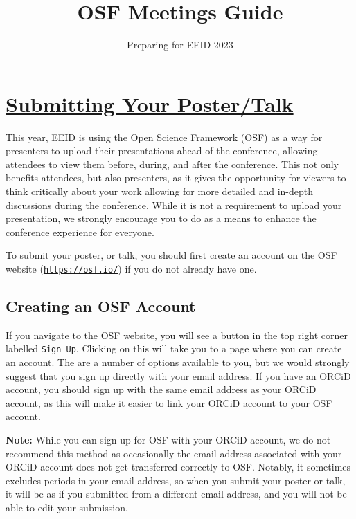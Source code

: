 \documentclass{scrartcl}
\begin{document}
\title{\vspace{-1cm}\textbf{OSF Meetings Guide}}
\subtitle{Preparing for EEID 2023}
\maketitle

\vspace*{-1cm}

\tableofcontents

\section{\underline{Submitting Your Poster/Talk}}

This year, EEID is using the Open Science Framework (OSF) as a way for presenters to upload their presentations ahead of the conference, allowing attendees to view them before, during, and after the conference.
This not only benefits attendees, but also presenters, as it gives the opportunity for viewers to think critically about your work allowing for more detailed and in-depth discussions during the conference.
While it is not a requirement to upload your presentation, we strongly encourage you to do as a means to enhance the conference experience for everyone.


To submit your poster, or talk, you should first create an account on the OSF website (\href{https://osf.io/}{\texttt{https://osf.io/}}) if you do not already have one.

\subsection{Creating an OSF Account}

If you navigate to the OSF website, you will see a button in the top right corner labelled \texttt{Sign Up}.
Clicking on this will take you to a page where you can create an account.
The are a number of options available to you, but we would strongly suggest that you sign up directly with your email address.
If you have an ORCiD account, you should sign up with the same email address as your ORCiD account, as this will make it easier to link your ORCiD account to your OSF account.


\begin{displayquote}
    \textbf{Note:} While you can sign up for OSF with your ORCiD account, we do not recommend this method as occasionally the email address associated with your ORCiD account does not get transferred correctly to OSF.
    Notably, it sometimes excludes periods in your email address, so when you submit your poster or talk, it will be as if you submitted from a different email address, and you will not be able to edit your submission.
\end{displayquote}
\end{document}
